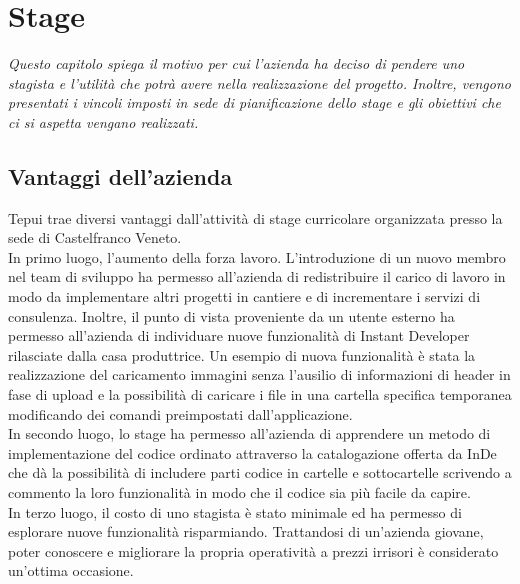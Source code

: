 \chapter{Stage}
\textit{Questo capitolo spiega il motivo per cui l'azienda ha deciso di pendere uno stagista e l'utilità che potrà avere nella realizzazione del progetto. Inoltre, vengono presentati i vincoli imposti in sede di pianificazione dello stage e gli obiettivi che ci si aspetta vengano realizzati.}

\section{Vantaggi dell'azienda}
Tepui trae diversi vantaggi dall'attività di stage curricolare organizzata presso la sede di Castelfranco Veneto.\\

In primo luogo, l'aumento della forza lavoro. L'introduzione di un nuovo membro nel team di sviluppo ha permesso all'azienda di redistribuire il carico di lavoro in modo da implementare altri progetti in cantiere e di incrementare i servizi di consulenza. Inoltre, il punto di vista proveniente da un utente esterno ha permesso all'azienda di individuare nuove funzionalità di Instant Developer rilasciate dalla casa produttrice.
Un esempio di nuova funzionalità è stata la realizzazione del caricamento immagini senza l'ausilio di informazioni di header in fase di upload e la possibilità di caricare i file in una cartella specifica temporanea modificando dei comandi preimpostati dall'applicazione.
\\

In secondo luogo, lo stage ha permesso all'azienda di apprendere un metodo di implementazione del codice ordinato attraverso la catalogazione offerta da InDe che dà la possibilità di includere parti codice in cartelle e sottocartelle scrivendo a commento la loro funzionalità in modo che il codice sia più facile da capire.
\\

In terzo luogo, il costo di uno stagista è stato minimale ed ha permesso di esplorare nuove funzionalità risparmiando. Trattandosi di un'azienda giovane, poter conoscere e migliorare la propria operatività a prezzi irrisori è considerato un'ottima occasione. 


